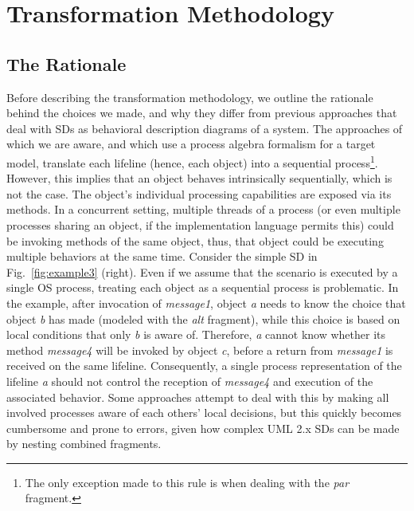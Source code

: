\documentclass[letter]{llncs}
\newcommand{\figshrink}{\vspace{-.6cm}}
\newcommand{\figshrinkend}{}
\newcommand{\secshrinkbegin}{\vspace{-.2cm}}
\newcommand{\subsecshrinkbegin}{\vspace{-.2cm}}
\begin{document}
\section{Transformation Methodology}
\label{sec:Methodology}
\secshrinkbegin
\vspace{-3 pt}
\subsection{The Rationale}
\subsecshrinkbegin
\vspace{-2 pt}
Before describing the transformation methodology, we outline the rationale behind the choices we made, and why they differ from previous approaches
that deal with SDs as behavioral description diagrams of a system. 
The approaches of which we are aware, and which use a process algebra formalism for a target model, translate each lifeline (hence, each object) into a 
sequential process\footnote{The only exception made to this rule is when dealing with the \emph{par} fragment.}. However, this implies that an object 
behaves intrinsically sequentially, which is not the case. The object's individual processing capabilities are exposed via its methods. 
In a concurrent setting, multiple threads of a process (or even multiple processes sharing an object, if the implementation language permits this) 
could be invoking methods of the same object, thus, that object could be executing multiple behaviors at the same time.
Consider the simple SD in Fig.~\ref{fig:example3} (right). 
Even if we assume that the scenario is executed by a single OS process, treating 
each object as a sequential process is problematic. In the example, after invocation of \emph{message1}, object \emph{a}
needs to know the choice that object \emph{b} has made (modeled with the \emph{alt} fragment), while this choice is based on local conditions that only \emph{b} is aware of. Therefore, \emph{a}
cannot know whether its method \emph{message4} will be invoked by object \emph{c}, before a return from \emph{message1} is received on the same lifeline.
Consequently, a single process representation of the lifeline \emph{a} should not control the reception of \emph{message4} and execution of the associated behavior.
Some approaches attempt to deal with this by making all involved processes aware of each others' local decisions, but this quickly becomes cumbersome and prone to errors, given
how complex UML 2.x SDs can be made by nesting combined fragments.
\end{document}
